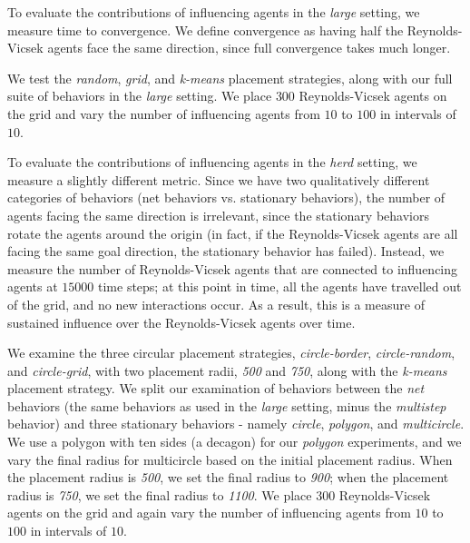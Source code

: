 To evaluate the contributions of influencing agents in the \textit{large}
setting, we measure time to convergence.
We define convergence as having half the Reynolds-Vicsek agents face the same
direction, since full convergence takes much longer.

We test the \textit{random}, \textit{grid}, and \textit{k-means} placement
strategies, along with our full suite of behaviors in the \textit{large}
setting.
We place $300$ Reynolds-Vicsek agents on the grid and vary
the number of influencing agents from $10$ to $100$ in intervals of $10$.

To evaluate the contributions of influencing agents in the \textit{herd}
setting, we measure a slightly different metric.
Since we have two qualitatively different categories of behaviors (net
behaviors vs. stationary behaviors), the number of agents facing the same
direction is irrelevant, since the stationary behaviors rotate the agents around
the origin (in fact, if the Reynolds-Vicsek agents are all facing the same
goal direction, the stationary behavior has failed).
Instead, we measure the number of Reynolds-Vicsek agents that are connected to
influencing agents at $15000$ time steps; at this point in time, all the agents
have travelled out of the grid, and no new interactions occur.
As a result, this is a measure of sustained influence over the Reynolds-Vicsek
agents over time.

We examine the three circular placement strategies, \textit{circle-border},
\textit{circle-random}, and \textit{circle-grid}, with two placement radii,
\textit{500} and \textit{750}, along with the \textit{k-means} placement
strategy.
We split our examination of behaviors between the \textit{net} behaviors
(the same behaviors as used in the \textit{large} setting, minus the
\textit{multistep} behavior) and three stationary behaviors - namely
\textit{circle}, \textit{polygon}, and \textit{multicircle}.
We use a polygon with ten sides (a decagon) for our \textit{polygon}
experiments, and we vary the final radius for multicircle based on the initial
placement radius.
When the placement radius is \textit{500}, we set the final radius to
\textit{900}; when the placement radius is \textit{750}, we set the final
radius to \textit{1100}.
We place $300$ Reynolds-Vicsek agents on the grid and again vary the number of
influencing agents from $10$ to $100$ in intervals of $10$.

